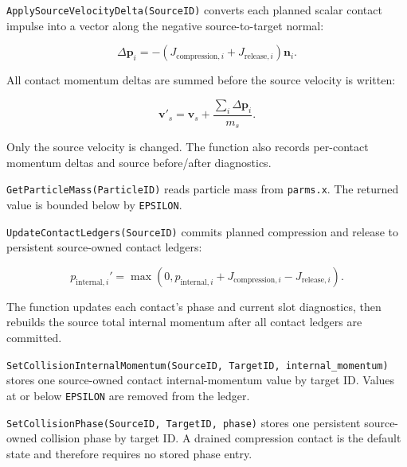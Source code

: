 
\texttt{ApplySourceVelocityDelta(SourceID)} converts each planned scalar
contact impulse into a vector along the negative source-to-target normal:

\begin{equation}
\Delta\mathbf{p}_i
=
-(J_{\mathrm{compression},i}+J_{\mathrm{release},i})\mathbf{n}_i.
\end{equation}

All contact momentum deltas are summed before the source velocity is written:

\begin{equation}
\mathbf{v}'_s
=
\mathbf{v}_s+\frac{\sum_i\Delta\mathbf{p}_i}{m_s}.
\end{equation}

Only the source velocity is changed.  The function also records per-contact
momentum deltas and source before/after diagnostics.


\texttt{GetParticleMass(ParticleID)} reads particle mass from
\texttt{parms.x}.  The returned value is bounded below by \texttt{EPSILON}.


\texttt{UpdateContactLedgers(SourceID)} commits planned compression and release
to persistent source-owned contact ledgers:

\begin{equation}
p_{\mathrm{internal},i}'
=
\max(0,
p_{\mathrm{internal},i}
+ J_{\mathrm{compression},i}
- J_{\mathrm{release},i}).
\end{equation}

The function updates each contact's phase and current slot diagnostics, then
rebuilds the source total internal momentum after all contact ledgers are
committed.


\texttt{SetCollisionInternalMomentum(SourceID, TargetID, internal\_momentum)}
stores one source-owned contact internal-momentum value by target ID.  Values at
or below \texttt{EPSILON} are removed from the ledger.


\texttt{SetCollisionPhase(SourceID, TargetID, phase)} stores one persistent
source-owned collision phase by target ID.  A drained compression contact is
the default state and therefore requires no stored phase entry.

